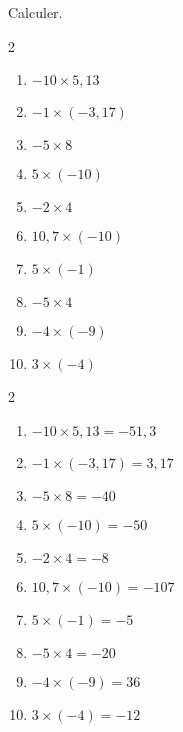 \begin{exercice*}
    Calculer.
    \begin{multicols}2
        \begin{enumerate}
            \item $ -10 \times  5,13 $
            \item $ -1 \times  (-3,17) $
            \item $ -5 \times  8 $
            \item $ 5 \times  (-10) $
            \item $ -2 \times  4 $
            \item $ 10,7 \times  (-10) $
            \item $ 5 \times  (-1) $
            \item $ -5 \times  4 $
            \item $ -4 \times  (-9) $
            \item $ 3 \times  (-4) $          
        \end{enumerate}
    \end{multicols}

\end{exercice*}
\begin{corrige}
    \phantom{rrr}    
    \begin{multicols}2
        \begin{enumerate}
            \item $ -10 \times  5,13 = -51,3 $
            \item $ -1 \times  (-3,17) = 3,17 $
            \item $ -5 \times  8 = -40 $
            \item $ 5 \times  (-10) = -50 $
            \item $ -2 \times  4 = -8 $
            \item $ 10,7 \times  (-10) = -107 $
            \item $ 5 \times  (-1) = -5 $
            \item $ -5 \times  4 = -20 $
            \item $ -4 \times  (-9) = 36 $
            \item $ 3 \times  (-4) = -12 $
        \end{enumerate}
    \end{multicols}
\end{corrige}